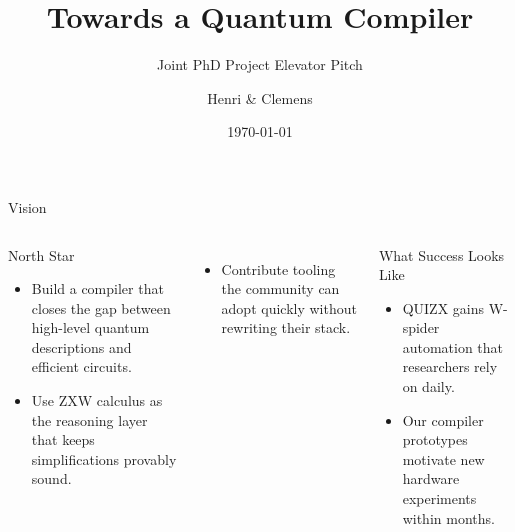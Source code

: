 \documentclass[aspectratio=169]{beamer}
\title{Towards a Quantum Compiler}
\subtitle{Joint PhD Project Elevator Pitch}
\author{Henri \& Clemens}
\date{\today}
\begin{document}
\begin{frame}[plain]
  \titlepage
\end{frame}

\begin{frame}[t]{Vision}
  \begin{columns}[T,onlytextwidth]
      \begin{block}{North Star}
        \begin{itemize}
          \item Build a compiler that closes the gap between high-level quantum descriptions and efficient circuits.
          \item Use ZXW calculus as the reasoning layer that keeps simplifications provably sound.
        \end{itemize}
      \end{block}
      \vspace{0.25cm}
      \begin{itemize}
        \item Contribute tooling the community can adopt quickly without rewriting their stack.
      \end{itemize}
      \begin{alertblock}{What Success Looks Like}
        \begin{itemize}
          \item QUIZX gains W-spider automation that researchers rely on daily.
          \item Our compiler prototypes motivate new hardware experiments within months.
        \end{itemize}
      \end{alertblock}
  \end{columns}
\end{frame}
\end{document}
